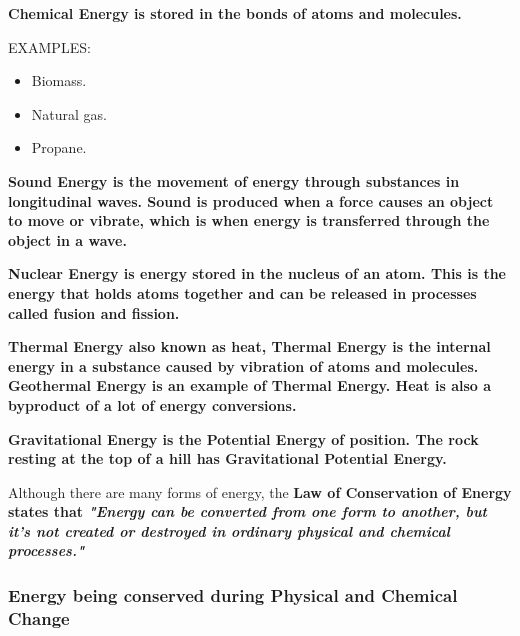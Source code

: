 \begin{definition}
	\bf{Chemical Energy} is stored in the bonds of atoms and molecules.

	EXAMPLES:
	\begin{itemize}
		\item Biomass.
		\item Natural gas.
		\item Propane.
	\end{itemize}
\end{definition}

\begin{definition}
	\bf{Sound Energy} is the movement of energy through substances in
	longitudinal waves.  Sound is produced when a force causes an object to move
	or vibrate, which is when energy is transferred through the object in a wave.
\end{definition}

\begin{definition}
	\bf{Nuclear Energy} is energy stored in the nucleus of an atom. This is
	the energy that holds atoms together and can be released in processes called
	fusion and fission.
\end{definition}

\begin{definition}
	\bf{Thermal Energy} also known as \bf{heat}, \bf{Thermal Energy}
	is the internal energy in a substance caused by vibration of atoms and
	molecules. \bf{Geothermal Energy} is an example of \bf{Thermal
	Energy}. Heat is also a byproduct of a lot of energy conversions.
\end{definition}

\begin{definition}
	\bf{Gravitational Energy} is the \bf{Potential Energy} of position.
	The rock resting at the top of a hill has \bf{Gravitational Potential
	Energy}.
\end{definition}

Although there are many forms of energy, the \bf{Law of Conservation of Energy} states that
\it{\bf{"Energy can be converted from one form to another, but it's not created or destroyed in ordinary physical and chemical processes."}}

\subsubsection*{Energy being conserved during Physical and Chemical Change}

